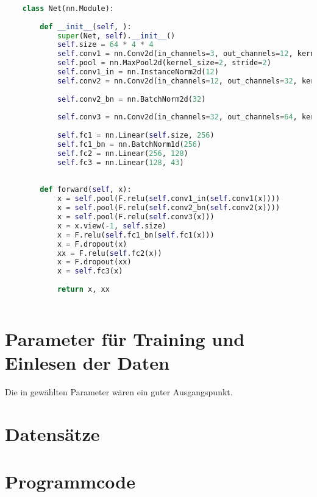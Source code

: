 \documentclass{article}
\theoremstyle{break}
\begin{document}
	\begin{lstlisting}[language=Python, caption=Kleines Netzwerk]
	
	class Net(nn.Module):
	
		def __init__(self, ):
			super(Net, self).__init__()
			self.size = 64 * 4 * 4
			self.conv1 = nn.Conv2d(in_channels=3, out_channels=12, kernel_size=5, padding=2)
			self.pool = nn.MaxPool2d(kernel_size=2, stride=2)
			self.conv1_in = nn.InstanceNorm2d(12)
			self.conv2 = nn.Conv2d(in_channels=12, out_channels=32, kernel_size=5, padding=2)
			
			self.conv2_bn = nn.BatchNorm2d(32)
			
			self.conv3 = nn.Conv2d(in_channels=32, out_channels=64, kernel_size=5, padding=2)
			
			self.fc1 = nn.Linear(self.size, 256)
			self.fc1_bn = nn.BatchNorm1d(256)
			self.fc2 = nn.Linear(256, 128)
			self.fc3 = nn.Linear(128, 43)
		
	
		def forward(self, x):
			x = self.pool(F.relu(self.conv1_in(self.conv1(x))))
			x = self.pool(F.relu(self.conv2_bn(self.conv2(x))))
			x = self.pool(F.relu(self.conv3(x)))
			x = x.view(-1, self.size)
			x = F.relu(self.fc1_bn(self.fc1(x)))
			x = F.dropout(x)
			xx = F.relu(self.fc2(x))
			x = F.dropout(xx)
			x = self.fc3(x)
			
			return x, xx
	
	\end{lstlisting}
	\section{Parameter für Training und Einlesen der Daten}
	Die in \cite{CH} gewählten Parameter wären ein guter Ausgangspunkt.
	\section{Datensätze}
	\section{Programmcode}
	
	\newpage
	
	\printglossaries
\end{document}
